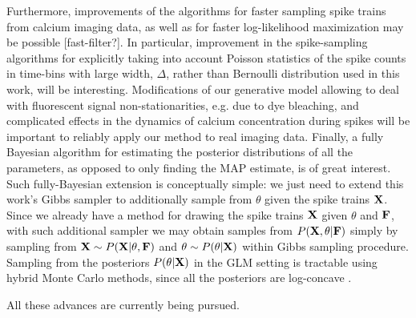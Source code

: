 Furthermore, improvements of the algorithms for faster sampling spike trains from calcium imaging data, as well as for faster log-likelihood maximization may be possible [fast-filter?]. In particular, improvement in the spike-sampling algorithms for explicitly taking into account Poisson statistics of the spike counts in time-bins with large width, $\Delta$, rather than Bernoulli distribution used in this work, will be interesting. Modifications of our generative model allowing to deal with fluorescent signal non-stationarities, e.g. due to dye bleaching, and complicated effects in the dynamics of calcium concentration during spikes will be important to reliably apply our method to real imaging data.
Finally, a fully Bayesian algorithm for estimating the posterior distributions of all the parameters, as opposed to only finding the MAP estimate, is of great interest. Such fully-Bayesian extension is conceptually simple: we just need to extend this work's Gibbs sampler to additionally sample from $\theta$ given the spike trains ${\bf X}$. Since we already have a method for drawing the spike trains ${\bf X}$ given $\theta$ and ${\bf F}$, with such additional sampler we may obtain samples from $P({\bf X},\theta|{\bf F})$ simply by sampling from ${\bf X} \sim P({\bf X}|\theta,{\bf F})$ and $\theta \sim P(\theta|{\bf X})$ within Gibbs sampling procedure.  Sampling from the posteriors $P(\theta|{\bf X})$ in the GLM setting is tractable using hybrid Monte Carlo methods, since all the posteriors are log-concave \cite{Ishwaran99,Gamerman97,Gamerman98,Yashar08}.

All these advances are currently being pursued.




